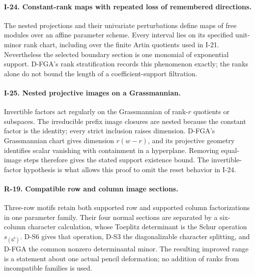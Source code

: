 \documentclass[11pt,a4paper]{article}
\theoremstyle{definition}\newtheorem{definition}{Definition}
\begin{document}
\paragraph{I-24. Constant-rank maps with repeated loss of remembered directions.}
The nested projections and their univariate perturbations define maps of free modules over an affine parameter scheme. Every interval lies on its specified unit-minor rank chart, including over the finite Artin quotients used in I-21. Nevertheless the selected boundary section is one monomial of exponential support. D-FGA's rank stratification records this phenomenon exactly; the ranks alone do not bound the length of a coefficient-support filtration.

\paragraph{I-25. Nested projective images on a Grassmannian.}
Invertible factors act regularly on the Grassmannian of rank-$r$ quotients or subspaces. The irreducible prefix image closures are nested because the constant factor is the identity; every strict inclusion raises dimension. D-FGA's Grassmannian chart gives dimension $r(w-r)$, and its projective geometry identifies scalar vanishing with containment in a hyperplane. Removing equal-image steps therefore gives the stated support existence bound. The invertible-factor hypothesis is what allows this proof to omit the reset behavior in I-24.

\paragraph{R-19. Compatible row and column image sections.}
Three-row motifs retain both supported row and supported column factorizations in one parameter family. Their four normal sections are separated by a six-column character calculation, whose Toeplitz determinant is the Schur operation $s_{(6^b)}$. D-S6 gives that operation, D-S3 the diagonalizable character splitting, and D-FGA the common nonzero determinantal minor. The resulting improved range is a statement about one actual pencil deformation; no addition of ranks from incompatible families is used.
\end{document}
